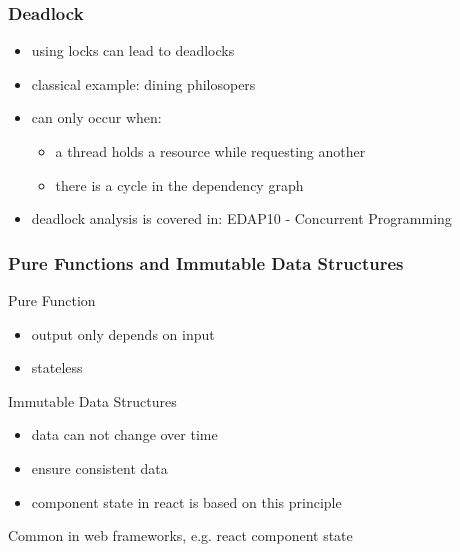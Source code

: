 \begin{frame}[fragile] \frametitle{Deadlock}
\begin{itemize}
  \item using locks can lead to deadlocks
  \item classical example: dining philosopers
  \item can only occur when:
  \begin{itemize}
    \item a thread holds a resource while requesting another
    \item there is a cycle in the dependency graph
  \end{itemize}
  \item deadlock analysis is covered in: EDAP10 - Concurrent Programming
\end{itemize}
\end{frame}

\begin{frame}[fragile] \frametitle{Pure Functions and Immutable Data Structures}
Pure Function
\begin{itemize}
  \item output only depends on input
  \item stateless
\end{itemize}
\vspace{3mm}

Immutable Data Structures
\begin{itemize}
  \item data can not change over time
  \item ensure consistent data
  \item component state in react is based on this principle
\end{itemize}

\vspace{5mm}
Common in web frameworks, e.g. react component state
\end{frame}


